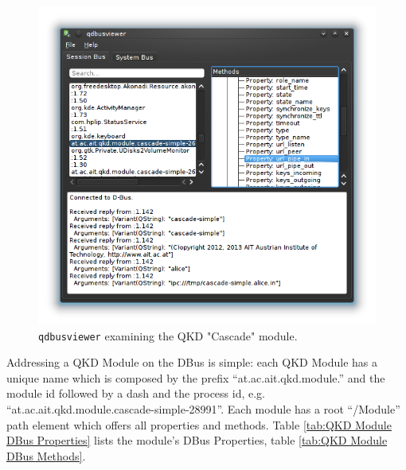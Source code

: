 \begin{figure}[h]
    \centering
    \includegraphics[scale=0.8,keepaspectratio=true]{./gfx/qkd-dbus-viewer.png}
    \caption{\texttt{qdbusviewer} examining the QKD "Cascade" module.}
    \label{fig:qkd-dbus-viewer}
\end{figure}

\medskip

Addressing a QKD Module on the DBus is simple: each QKD Module has a unique name which is composed by the prefix ``at.ac.ait.qkd.module.'' and the module id followed by a dash and the process id, e.g. ``at.ac.ait.qkd.module.cascade-simple-28991''. Each module has a root ``/Module'' path element which offers all properties and methods. Table \ref{tab:QKD Module DBus Properties} lists the module's DBus Properties, table \ref{tab:QKD Module DBus Methods}.

\medskip

